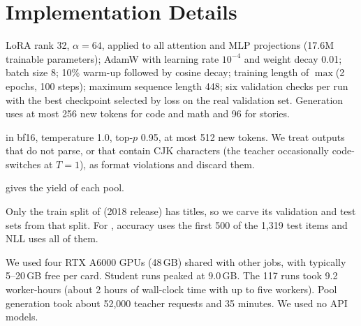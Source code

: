 \section{Implementation Details}
\label{sec:app_details}

 LoRA rank 32, $\alpha = 64$, applied to all attention and MLP projections (17.6M trainable parameters); AdamW with learning rate $10^{-4}$ and weight decay 0.01; batch size 8; 10\% warm-up followed by cosine decay; training length of $\max$(2 epochs, 100 steps); maximum sequence length 448; six validation checks per run with the best checkpoint selected by loss on the real validation set.
Generation uses at most 256 new tokens for code and math and 96 for stories.

 \teacher in bf16, temperature 1.0, top-$p$ 0.95, at most 512 new tokens. We treat outputs that do not parse, or that contain CJK characters (the teacher occasionally code-switches at $T = 1$), as format violations and discard them.

  gives the yield of each pool.

\begin{table}[h]
    \centering
    \caption{Synthetic pools per seed.}
    \label{tab:pools}
\end{table}

 Only the train split of \roc (2018 release) has titles, so we carve its validation and test sets from that split.
For \gsm, accuracy uses the first 500 of the 1,319 test items and NLL uses all of them.

 We used four RTX A6000 GPUs (48\,GB) shared with other jobs, with typically 5--20\,GB free per card. Student runs peaked at 9.0\,GB. The 117 runs took 9.2 worker-hours (about 2 hours of wall-clock time with up to five workers). Pool generation took about 52,000 teacher requests and 35 minutes. We used no API models.

